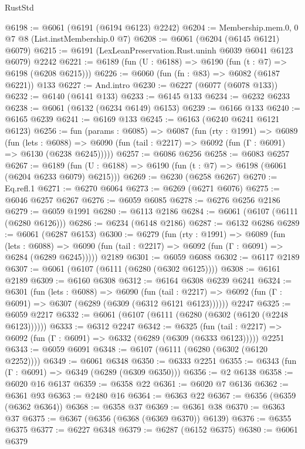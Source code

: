 \begin{lexlean}{RustStd}
\begin{coremodule}
{\begin{coremodule}
{{{{{{{{{{{{{{{{{{{{{{{{{{@6198 := @6061 (@6191 (@6194 @6123) @2242)
@6204 := Membership.mem.{0, 0} @7 @8 (List.instMembership.{0} @7)
@6208 := @6061 (@6204 (@6145 @6121) @6079)
@6215 := @6191 (LexLeanPreservation.Rust.uninh @6039 @6041 @6123 @6079) @2242
@6221 := @6189 (fun (U : @6188) => @6190 (fun (t : @7) => @6198 (@6208 @6215)))
@6226 := @6060 (fun (fn : @83) => @6082 (@6187 @6221)) @133
@6227 := And.intro
@6230 := @6227 (@6077 (@6078 @133))
@6232 := @6140 (@6141 @133)
@6233 := @6145 @133
@6234 := @6232 @6233
@6238 := @6061 (@6132 (@6234 @6149) @6153)
@6239 := @6166 @133
@6240 := @6165 @6239
@6241 := @6169 @133
@6245 := @6163 (@6240 @6241 @6121 @6123)
@6256 := fun (params : @6085) =>
  @6087
    (fun (rty : @1991) =>
    @6089
      (fun (lets : @6088) =>
      @6090 (fun (tail : @2217) => @6092 (fun (Γ : @6091) => @6130 (@6238 @6245)))))
@6257 := @6086 @6256
@6258 := @6083 @6257
@6267 := @6189 (fun (U : @6188) => @6190 (fun (t : @7) => @6198 (@6061 (@6204 @6233 @6079) @6215)))
@6269 := @6230 (@6258 @6267)
@6270 := Eq.refl.{1}
@6271 := @6270 @6064
@6273 := @6269 (@6271 @6076)
@6275 := @6046 @6257 @6267
@6276 := @6059 @6085
@6278 := @6276 @6256 @2186
@6279 := @6059 @1991
@6280 := @6113 @2186
@6284 := @6061 (@6107 (@6111 (@6280 @6126)))
@6286 := @6234 (@6148 @2186)
@6287 := @6132 @6286
@6289 := @6061 (@6287 @6153)
@6300 := @6279
    (fun (rty : @1991) =>
    @6089
      (fun (lets : @6088) =>
      @6090 (fun (tail : @2217) => @6092 (fun (Γ : @6091) => @6284 (@6289 @6245)))))
    @2189
@6301 := @6059 @6088
@6302 := @6117 @2189
@6307 := @6061 (@6107 (@6111 (@6280 (@6302 @6125))))
@6308 := @6161 @2189
@6309 := @6160 @6308
@6312 := @6164 @6308 @6239 @6241
@6324 := @6301
    (fun (lets : @6088) =>
    @6090
      (fun (tail : @2217) => @6092 (fun (Γ : @6091) => @6307 (@6289 (@6309 (@6312 @6121 @6123))))))
    @2247
@6325 := @6059 @2217
@6332 := @6061 (@6107 (@6111 (@6280 (@6302 (@6120 (@2248 @6123))))))
@6333 := @6312 @2247
@6342 := @6325
    (fun (tail : @2217) => @6092 (fun (Γ : @6091) => @6332 (@6289 (@6309 (@6333 @6123)))))
    @2251
@6343 := @6059 @6091
@6348 := @6107 (@6111 (@6280 (@6302 (@6120 @2252))))
@6349 := @6061 @6348
@6350 := @6333 @2251
@6355 := @6343 (fun (Γ : @6091) => @6349 (@6289 (@6309 @6350)))
@6356 := @2 @6138
@6358 := @6020 @16 @6137
@6359 := @6358 @22
@6361 := @6020 @7 @6136
@6362 := @6361 @93
@6363 := @2480 @16
@6364 := @6363 @22
@6367 := @6356 (@6359 (@6362 @6364))
@6368 := @6358 @37
@6369 := @6361 @38
@6370 := @6363 @37
@6375 := @6367 (@6356 (@6368 (@6369 @6370)) @6139)
@6376 := @6355 @6375
@6377 := @6227 @6348
@6379 := @6287 (@6152 @6375)
@6380 := @6061 @6379
}}}}}}}}}}}}}}}}}}}}}}}}}}
\end{coremodule}}
\end{coremodule}
\end{lexlean}
